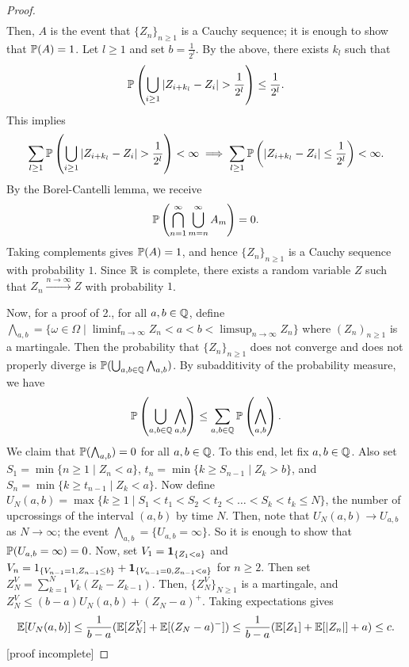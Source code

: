 \begin{proof}
\begin{align}
    \end{align}
    Then, $A$ is the event that $\{Z_{n}\}_{n \geq 1}$ is a Cauchy sequence; it is enough to show that $\mathbb{P}(A) = 1$. Let $l \geq 1$ and set $b = \frac{1}{2^{l}}$. By the above, there exists $k_{l}$ such that
    \begin{align}
        \mathbb{P}\left( \bigcup_{i \geq 1} \left| Z_{i+k_{l}}-Z_{i} \right| > \frac{1}{2^{l}} \right) \leq \frac{1}{2^{l}}.
    \end{align}
    This implies
    \begin{align}
        \sum_{l \geq 1} \mathbb{P}\left( \bigcup_{i \geq 1} \left| Z_{i+k_{l}}-Z_{i} \right| > \frac{1}{2^{l}} \right) < \infty \implies \sum_{l \geq 1} \mathbb{P}\left(  \left| Z_{i+k_{l}}-Z_{i} \right| \leq \frac{1}{2^{l}} \right) < \infty.
    \end{align}
    By the Borel-Cantelli lemma, we receive
    \begin{align}
        \mathbb{P}\left( \bigcap_{n=1}^{\infty} \bigcup_{m=n}^{\infty} A_{m} \right) = 0.
    \end{align}
    Taking complements gives $\mathbb{P}(A) = 1$, and hence $\{Z_{n}\}_{n \geq 1}$ is a Cauchy sequence with probability $1$. Since $\mathbb{R}$ is complete, there exists a random variable $Z$ such that $Z_{n} \xrightarrow{n \to \infty} Z$ with probability $1$.

    Now, for a proof of 2., for all $a,b \in \mathbb{Q}$, define $\bigwedge_{a,b} = \{\omega \in \Omega \mid \liminf_{n \to \infty} Z_{n} < a < b < \limsup_{n \to \infty} Z_{n}\}$ where $(Z_{n})_{n \geq 1}$ is a martingale. Then the probability that $\{Z_{n}\}_{n \geq 1}$ does not converge and does not properly diverge is $\mathbb{P}(\bigcup_{a,b \in \mathbb{Q}} \bigwedge_{a,b})$. By subadditivity of the probability measure, we have
    \begin{align}
        \mathbb{P}\left(\bigcup_{a,b \in \mathbb{Q}} \bigwedge_{a,b}\right) \leq \sum_{a,b \in \mathbb{Q}} \mathbb{P}\left(\bigwedge_{a,b}\right).
    \end{align}
    We claim that $\mathbb{P}(\bigwedge_{a,b}) = 0$ for all $a,b \in \mathbb{Q}$. 
    To this end, let fix $a,b \in \mathbb{Q}$. Also set $S_{1} = \min\{n \geq 1 \mid Z_{n} < a\}$, $t_{n} = \min\{k \geq S_{n-1} \mid Z_{k} > b\}$, and $S_{n} = \min\{k \geq t_{n-1} \mid Z_{k} < a\}$. Now define $U_{N}(a,b) = \max\{k \geq 1 \mid S_{1} < t_{1} < S_{2} < t_{2} < \ldots < S_{k} < t_{k} \leq N\}$, the number of upcrossings of the interval $(a,b)$ by time $N$. Then, note that $U_{N}(a,b) \to U_{a,b}$ as $N \to \infty$; the event $\bigwedge_{a,b} = \{U_{a,b} = \infty\}$. So it is enough to show that $\mathbb{P}(U_{a,b} = \infty) = 0$. Now, set $V_{1} = \textbf{1}_{\{Z_{1} < a\}}$ and $V_{n} = 1_{\{V_{n-1}=1,Z_{n-1} \leq b\}} + \textbf{1}_{\{V_{n-1}=0,Z_{n-1} < a\}}$ for $n \geq 2$. Then set $Z_{N}^{V} = \sum_{k=1}^{N} V_{k}(Z_{k}-Z_{k-1})$. Then, $\{Z_{N}^{V}\}_{N \geq 1}$ is a martingale, and $Z_{N}^{V} \leq (b-a)U_{N}(a,b) + (Z_{N}-a)^{+}$. Taking expectations gives
    \begin{align}
        \mathbb{E}[U_{N}(a,b)] \leq \frac{1}{b-a} (\mathbb{E}[Z_{N}^{V}] + \mathbb{E}[(Z_{N}-a)^{-}]) \leq \frac{1}{b-a} (\mathbb{E}[Z_{1}] + \mathbb{E}[\left| Z_{n} \right|] + a) \leq c.
    \end{align}
    [proof incomplete]


\end{proof}
